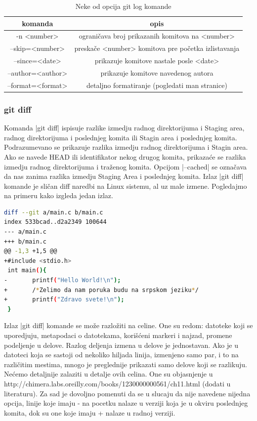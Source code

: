 \documentclass[a4paper]{article}
\begin{document}
{\begin{table}[h!]
\begin{center}


\begin{tabular}{cc} \hline
komanda & opis\\ \hline
-n <number> & ograničava broj prikazanih komitova na <number> \\
--skip=<number> & preskače <number> komitova pre početka izlistavanja \\
--since=<date> & prikazuje komitove nastale posle <date> \\
--author=<author> & prikazuje komitove navedenog autora \\
--format=<format> & detaljno formatiranje (pogledati man stranice)
\end{tabular}
\caption{Neke od opcija git log komande}
\end{center}
\label{tab:tabela1}

\end{table}


\subsubsection*{git diff}
\label{subsec:git_diff}
Komanda |git diff| ispisuje razlike izmedju radnog direktorijuma i Staging area, radnog direktorijuma i poslednjeg komita ili Stagin area i poslednjeg komita. \\
Podrazumevano se prikazuje razlika izmedju radnog direktorijuma i Stagin area. Ako se navede HEAD ili identifikator nekog drugog komita, prikazaće se razlika izmedju radnog direktorijuma i traženog komita. Opcijom |--cached| se označava da nas zanima razlika izmedju Staging Area i poslednjeg komita.
Izlaz |git diff| komande je sličan diff naredbi na Linux sistemu, al uz male izmene. Pogledajmo na primeru kako izgleda jedan izlaz.
\begin{lstlisting}[language=bash]
diff --git a/main.c b/main.c
index 533bcad..d2a2349 100644
--- a/main.c
+++ b/main.c
@@ -1,3 +1,5 @@
+#include <stdio.h>
 int main(){
-       printf("Hello World!\n");
+       /*Zelimo da nam poruka budu na srpskom jeziku*/
+       printf("Zdravo svete!\n");
 }
\end{lstlisting}
Izlaz |git diff| komande se može razložiti na celine. One su redom: datoteke koji se uporedjuju, metapodaci o datotekama, korišćeni markeri i najzad, promene podeljenje u delove. Razlog deljenja izmena u delove je jednostavan. Ako je u datoteci koja se sastoji od nekoliko hiljada linija, izmenjeno samo par, i to na različitim mestima, mnogo je preglednije prikazati samo delove koji se razlikuju. Nećemo detaljnije zalaziti u detalje ovih celina. One su objasnjenje u http://chimera.labs.oreilly.com/books/1230000000561/ch11.html (dodati u literaturu). Za sad je dovoljno pomenuti da se u slucaju da nije navedene nijedna opcija, linije koje imaju - na pocetku nalaze u verziji koja je u okviru poslednjeg komita, dok su one koje imaju + nalaze u radnoj verziji.


}
\end{document}
